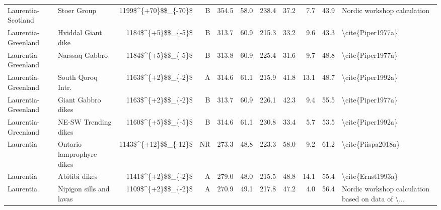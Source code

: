 \begin{longtable}{p{1 in}p{1 in}rrrrrrrr}
            Laurentia-Scotland &                                      Stoer Group &   1199\$\textasciicircum \{+70\}\$\$\_\{-70\}\$ &      B &     354.5 &      58.0 & 238.4 &  37.2 &       7.7 &        43.9 &                        Nordic workshop calculation \\
           Laurentia-Greenland &                               Hviddal Giant dike &     1184\$\textasciicircum \{+5\}\$\$\_\{-5\}\$ &      B &     313.7 &      60.9 & 215.3 &  33.2 &       9.6 &        43.3 &                                  \textbackslash cite\{Piper1977a\} \\
           Laurentia-Greenland &                                   Narssaq Gabbro &     1184\$\textasciicircum \{+5\}\$\$\_\{-5\}\$ &      B &     313.8 &      60.9 & 225.4 &  31.6 &       9.7 &        48.8 &                                  \textbackslash cite\{Piper1977a\} \\
           Laurentia-Greenland &                                South Qoroq Intr. &     1163\$\textasciicircum \{+2\}\$\$\_\{-2\}\$ &      A &     314.6 &      61.1 & 215.9 &  41.8 &      13.1 &        48.7 &                                  \textbackslash cite\{Piper1992a\} \\
           Laurentia-Greenland &                               Giant Gabbro dikes &     1163\$\textasciicircum \{+2\}\$\$\_\{-2\}\$ &      B &     313.7 &      60.9 & 226.1 &  42.3 &       9.4 &        55.5 &                                  \textbackslash cite\{Piper1977a\} \\
           Laurentia-Greenland &                             NE-SW Trending dikes &     1160\$\textasciicircum \{+5\}\$\$\_\{-5\}\$ &      B &     314.6 &      61.1 & 230.8 &  33.4 &       5.7 &        53.5 &                                  \textbackslash cite\{Piper1992a\} \\
                     Laurentia &                        Ontario lamprophyre dikes &   1143\$\textasciicircum \{+12\}\$\$\_\{-12\}\$ &     NR &     273.3 &      48.8 & 223.3 &  58.0 &       9.2 &        61.2 &                                 \textbackslash cite\{Piispa2018a\} \\
                     Laurentia &                                    Abitibi dikes &     1141\$\textasciicircum \{+2\}\$\$\_\{-2\}\$ &      A &     279.0 &      48.0 & 215.5 &  48.8 &      14.1 &        55.4 &                                  \textbackslash cite\{Ernst1993a\} \\
                     Laurentia &                          Nipigon sills and lavas &     1109\$\textasciicircum \{+2\}\$\$\_\{-2\}\$ &      A &     270.9 &      49.1 & 217.8 &  47.2 &       4.0 &        56.4 &  Nordic workshop calculation based on data of \textbackslash ... \\

\end{longtable}

